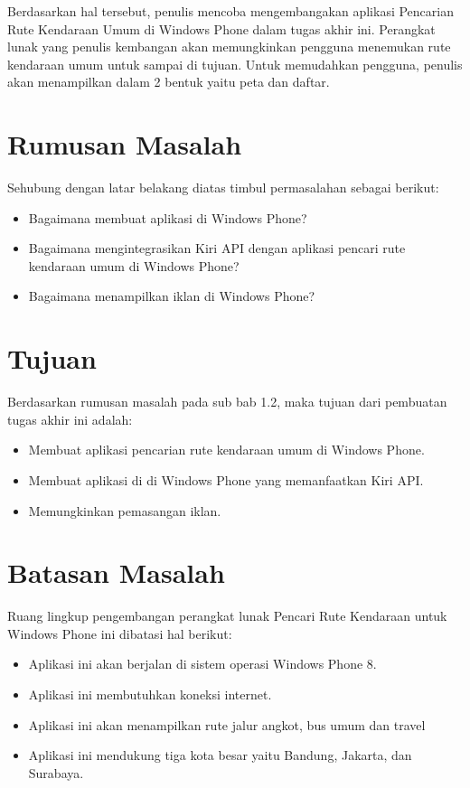\hspace{0.5cm} Berdasarkan hal tersebut, penulis mencoba mengembangakan aplikasi Pencarian Rute Kendaraan Umum di Windows Phone dalam tugas akhir ini. Perangkat lunak yang penulis kembangan akan memungkinkan pengguna menemukan rute kendaraan umum untuk sampai di tujuan. Untuk memudahkan pengguna, penulis akan menampilkan dalam 2 bentuk yaitu peta dan daftar. 

\section{Rumusan Masalah}
\label{sec:rumusan_masalah}
Sehubung dengan latar belakang diatas timbul permasalahan sebagai berikut:
\begin{itemize}
	\item Bagaimana membuat aplikasi di Windows Phone?
	\item Bagaimana mengintegrasikan Kiri API dengan aplikasi pencari rute kendaraan umum di Windows Phone?
	\item Bagaimana menampilkan iklan di Windows Phone?
\end{itemize}

\section{Tujuan}
\label{sec:tujuan}
Berdasarkan rumusan masalah pada sub bab 1.2, maka tujuan dari pembuatan tugas akhir ini adalah:
\begin{itemize}
	\item Membuat aplikasi pencarian rute kendaraan umum di Windows Phone.
	\item Membuat aplikasi di di Windows Phone yang memanfaatkan Kiri API.
	\item Memungkinkan pemasangan iklan.
\end{itemize}

\section{Batasan Masalah}
\label{sec:batasan_masalah}
Ruang lingkup pengembangan perangkat lunak Pencari Rute Kendaraan untuk Windows Phone ini dibatasi hal berikut:
\begin{itemize}
	\item Aplikasi ini akan berjalan di sistem operasi Windows Phone 8.
	\item Aplikasi ini membutuhkan koneksi internet.
	\item Aplikasi ini akan menampilkan rute jalur angkot, bus umum dan travel 
	\item Aplikasi ini mendukung tiga kota besar yaitu Bandung, Jakarta, dan Surabaya.
\end{itemize}

